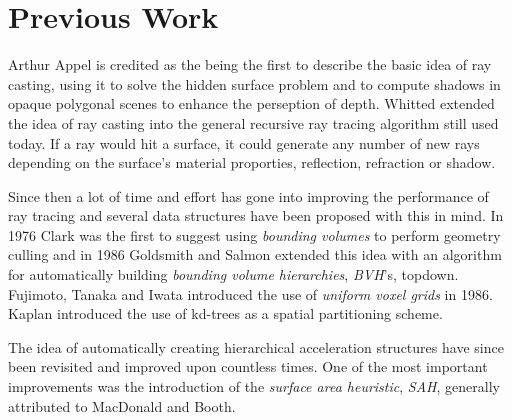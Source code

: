 




\chapter{Previous Work}



Arthur Appel is credited as the being the first to describe the basic
idea of ray casting, using it to solve the hidden
surface problem and to compute shadows in opaque polygonal scenes to
enhance the perseption of depth. Whitted extended the idea of ray
casting into the general recursive ray tracing algorithm still used
today. If a ray would hit a surface, it could
generate any number of new rays depending on the surface's material
proporties, reflection, refraction or shadow.



Since then a lot of time and effort has gone into improving the
performance of ray tracing and several data structures have been
proposed with this in mind. In 1976 Clark was the first to suggest
using \textit{bounding volumes} to perform geometry culling and in
1986 Goldsmith and Salmon extended this idea with an algorithm for
automatically building \textit{bounding volume hierarchies},
\textit{BVH}'s, topdown. Fujimoto, Tanaka and
Iwata introduced the use of \textit{uniform voxel grids} in
1986. Kaplan introduced the use of kd-trees as
a spatial partitioning scheme.


The idea of automatically creating hierarchical acceleration
structures have since been revisited and improved upon countless
times. One of the most important improvements was the introduction of
the \textit{surface area heuristic}, \textit{SAH}, generally
attributed to MacDonald and Booth.


